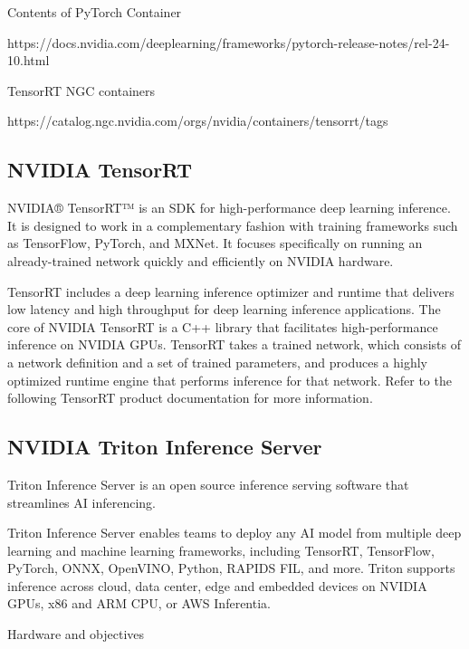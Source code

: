 \documentclass{article}
\begin{document}
Contents of PyTorch Container

https://docs.nvidia.com/deeplearning/frameworks/pytorch-release-notes/rel-24-10.html

TensorRT NGC containers

https://catalog.ngc.nvidia.com/orgs/nvidia/containers/tensorrt/tags

\subsection{NVIDIA TensorRT}

NVIDIA® TensorRT™ is an SDK for high-performance deep learning inference. It is designed to work in a complementary fashion with training frameworks such as TensorFlow, PyTorch, and MXNet. It focuses specifically on running an already-trained network quickly and efficiently on NVIDIA hardware.

TensorRT includes a deep learning inference optimizer and runtime that delivers low latency and high throughput for deep learning inference applications. The core of NVIDIA TensorRT is a C++ library that facilitates high-performance inference on NVIDIA GPUs. TensorRT takes a trained network, which consists of a network definition and a set of trained parameters, and produces a highly optimized runtime engine that performs inference for that network. Refer to the following TensorRT product documentation for more information.

\subsection{NVIDIA Triton Inference Server}

Triton Inference Server is an open source inference serving software that streamlines AI inferencing.

Triton Inference Server enables teams to deploy any AI model from multiple deep learning and machine learning frameworks, including TensorRT, TensorFlow, PyTorch, ONNX, OpenVINO, Python, RAPIDS FIL, and more. Triton supports inference across cloud, data center, edge and embedded devices on NVIDIA GPUs, x86 and ARM CPU, or AWS Inferentia.


Hardware and objectives

\end{document}

